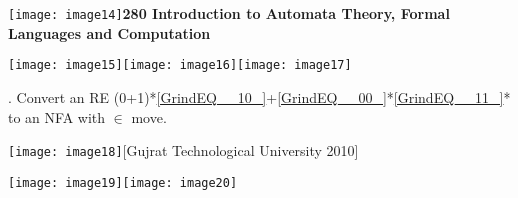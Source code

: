 \noindent \textbf{\textit{}}

\noindent \textbf{\textit{}}

\noindent \textbf{\textit{}}

\noindent \textbf{\textit{}}

\noindent \texttt{[image: image14]}\textbf{280 {\textbar} Introduction to Automata Theory, Formal Languages and Computation}

\noindent \textbf{}

\noindent \texttt{[image: image15]}\texttt{[image: image16]}\texttt{[image: image17]}\textbf{\textit{}}

\noindent 

\noindent 

\noindent 

\noindent 

\noindent 

\noindent 

\noindent 

\noindent 

\noindent 

\noindent 

\noindent  

. Convert an RE (0+1)*\eqref{GrindEQ__10_}+\eqref{GrindEQ__00_}*\eqref{GrindEQ__11_}* to an NFA with $\mathrm{\in }$ move.

\noindent \texttt{[image: image18]}[Gujrat Technological University 2010]

\noindent \texttt{[image: image19]}\texttt{[image: image20]}

